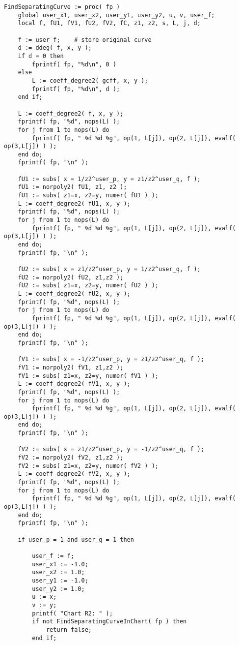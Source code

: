 \documentclass[a4paper,10pt]{article}
\begin{document}
\begin{lstlisting}[name=separatingcurves]
FindSeparatingCurve := proc( fp )
    global user_x1, user_x2, user_y1, user_y2, u, v, user_f;
    local f, fU1, fV1, fU2, fV2, fC, z1, z2, s, L, j, d;

    f := user_f;    # store original curve
    d := ddeg( f, x, y );
    if d = 0 then
        fprintf( fp, "%d\n", 0 )
    else
        L := coeff_degree2( gcff, x, y );
        fprintf( fp, "%d\n", d );
    end if;

    L := coeff_degree2( f, x, y );
    fprintf( fp, "%d", nops(L) );
    for j from 1 to nops(L) do
        fprintf( fp, " %d %d %g", op(1, L[j]), op(2, L[j]), evalf( op(3,L[j]) ) );
    end do;
    fprintf( fp, "\n" );

    fU1 := subs( x = 1/z2^user_p, y = z1/z2^user_q, f );
    fU1 := norpoly2( fU1, z1, z2 );
    fU1 := subs( z1=x, z2=y, numer( fU1 ) );
    L := coeff_degree2( fU1, x, y );
    fprintf( fp, "%d", nops(L) );
    for j from 1 to nops(L) do
        fprintf( fp, " %d %d %g", op(1, L[j]), op(2, L[j]), evalf( op(3,L[j]) ) );
    end do;
    fprintf( fp, "\n" );

    fU2 := subs( x = z1/z2^user_p, y = 1/z2^user_q, f );
    fU2 := norpoly2( fU2, z1,z2 );
    fU2 := subs( z1=x, z2=y, numer( fU2 ) );
    L := coeff_degree2( fU2, x, y );
    fprintf( fp, "%d", nops(L) );
    for j from 1 to nops(L) do
        fprintf( fp, " %d %d %g", op(1, L[j]), op(2, L[j]), evalf( op(3,L[j]) ) );
    end do;
    fprintf( fp, "\n" );

    fV1 := subs( x = -1/z2^user_p, y = z1/z2^user_q, f );
    fV1 := norpoly2( fV1, z1,z2 );
    fV1 := subs( z1=x, z2=y, numer( fV1 ) );
    L := coeff_degree2( fV1, x, y );
    fprintf( fp, "%d", nops(L) );
    for j from 1 to nops(L) do
        fprintf( fp, " %d %d %g", op(1, L[j]), op(2, L[j]), evalf( op(3,L[j]) ) );
    end do;
    fprintf( fp, "\n" );

    fV2 := subs( x = z1/z2^user_p, y = -1/z2^user_q, f );
    fV2 := norpoly2( fV2, z1,z2 );
    fV2 := subs( z1=x, z2=y, numer( fV2 ) );
    L := coeff_degree2( fV2, x, y );
    fprintf( fp, "%d", nops(L) );
    for j from 1 to nops(L) do
        fprintf( fp, " %d %d %g", op(1, L[j]), op(2, L[j]), evalf( op(3,L[j]) ) );
    end do;
    fprintf( fp, "\n" );

    if user_p = 1 and user_q = 1 then

        user_f := f;
        user_x1 := -1.0;
        user_x2 := 1.0;
        user_y1 := -1.0;
        user_y2 := 1.0;
        u := x;
        v := y;
        printf( "Chart R2: " );
        if not FindSeparatingCurveInChart( fp ) then
            return false;
        end if;


\end{lstlisting}
\end{document}
